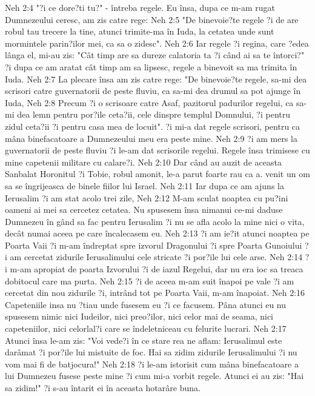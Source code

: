 Neh 2:4  "?i ce dore?ti tu?" - întreba regele. Eu însa, dupa ce m-am rugat Dumnezeului ceresc, am zis catre rege:
Neh 2:5  "De binevoie?te regele ?i de are robul tau trecere la tine, atunci trimite-ma în Iuda, la cetatea unde sunt mormintele parin?ilor mei, ca sa o zidesc".
Neh 2:6  Iar regele ?i regina, care ?edea lânga el, mi-au zis: "Cât timp are sa dureze calatoria ta ?i când ai sa te întorci?" ?i dupa ce am aratat cât timp am sa lipsesc, regele a binevoit sa ma trimita în Iuda.
Neh 2:7  La plecare însa am zis catre rege: "De binevoie?te regele, sa-mi dea scrisori catre guvernatorii de peste fluviu, ca sa-mi dea drumul sa pot ajunge în Iuda,
Neh 2:8  Precum ?i o scrisoare catre Asaf, pazitorul padurilor regelui, ca sa-mi dea lemn pentru por?ile ceta?ii, cele dinspre templul Domnului, ?i pentru zidul ceta?ii ?i pentru casa mea de locuit". ?i mi-a dat regele scrisori, pentru ca mâna binefacatoare a Dumnezeului meu era peste mine.
Neh 2:9  ?i am mers la guvernatorii de peste fluviu ?i le-am dat scrisorile regelui. Regele însa trimisese cu mine capetenii militare cu calare?i.
Neh 2:10  Dar când au auzit de aceasta Sanbalat Horonitul ?i Tobie, robul amonit, le-a parut foarte rau ca a. venit un om sa se îngrijeasca de binele fiilor lui Israel.
Neh 2:11  Iar dupa ce am ajuns la Ierusalim ?i am stat acolo trei zile,
Neh 2:12  M-am sculat noaptea cu pu?ini oameni ai mei sa cercetez cetatea. Nu spusesem însa nimanui ce-mi daduse Dumnezeu în gând sa fac pentru Ierusalim ?i nu se afla acolo la mine nici o vita, decât numai aceea pe care încalecasem eu.
Neh 2:13  ?i am ie?it atunci noaptea pe Poarta Vaii ?i m-am îndreptat spre izvorul Dragonului ?i spre Poarta Gunoiului ?i am cercetat zidurile Ierusalimului cele stricate ?i por?ile lui cele arse.
Neh 2:14  ?i m-am apropiat de poarta Izvorului ?i de iazul Regelui, dar nu era ioc sa treaca dobitocul care ma purta.
Neh 2:15  ?i de aceea m-am suit înapoi pe vale ?i am cercetat din nou zidurile ?i, intrând tot pe Poarta Vaii, m-am înapoiat.
Neh 2:16  Capeteniile insa nu ?tiau unde fusesem eu ?i ce facusem. Pâna atunci eu nu spusesem nimic nici Iudeilor, nici preo?ilor, nici celor mai de seama, nici capeteniilor, nici celorlal?i care se îndeletniceau cu felurite lucrari.
Neh 2:17  Atunci însa le-am zis: "Voi vede?i în ce stare rea ne aflam: Ierusalimul este darâmat ?i por?ile lui mistuite de foc. Hai sa zidim zidurile Ierusalimului ?i nu vom mai fi de batjocura!"
Neh 2:18  ?i le-am istorisit cum mâna binefacatoare a lui Dumnezeu fusese peste mine ?i cum mi-a vorbit regele. Atunci ei au zis: "Hai sa zidim!" ?i s-au întarit ei în aceasta hotarâre buna.
